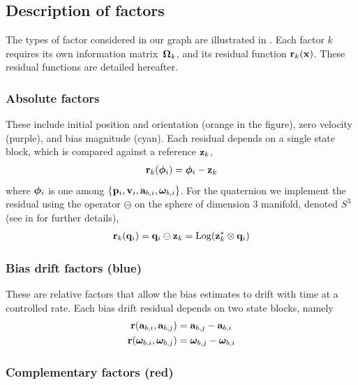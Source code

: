 \subsection{Description of factors}

The types of factor considered in our graph are illustrated in . 
Each factor $k$ requires its own information matrix~${\bm \Omega}_k$, and its residual function ${\bf r}_k({\bf x})$. These residual functions are detailed hereafter.

\subsubsection{Absolute factors}

These include initial position and orientation (orange in the figure), zero velocity (purple), and bias magnitude (cyan). Each residual depends on a single state block, which is compared against a reference ${\bf z}_k$,
%
\begin{align}
{\bf r}_k({\bm \phi}_i) = {\bm \phi}_i - {\bf z}_k
\end{align}
%
where ${\bm \phi}_i$ is one among $\{{\bf p}_i,{\bf v}_i,{\bf a}_{b,i},{{\bm \omega}}_{b,i}\}$. 
For the quaternion we implement the residual using the operator $\ominus$ on the sphere of dimension $3$ manifold, denoted $S^3$ (see  in  for further details),
%
\begin{align}
{\bf r}_k({\bf q}_i) = {\bf q}_i\ominus{\bf z}_k = \operatorname*{Log}({\bf z}_k^*\otimes{\bf q}_i)
\end{align}
%

\subsubsection{Bias drift factors (blue)}

These are relative factors that allow the bias estimates to drift with time at a controlled rate. Each bias drift residual depends on two state blocks, namely
%
\begin{align}
\begin{split}
{\bf r}({\bf a}_{b,i}, {\bf a}_{b,j}) &= {\bf a}_{b,j} - {\bf a}_{b,i} 
\\
{\bf r}({{\bm \omega}}_{b,i} , {{\bm \omega}}_{b,j})  &= {{\bm \omega}}_{b,j}  - {{\bm \omega}}_{b,i}
\end{split}
\end{align}

\subsubsection{Complementary factors (red)}

